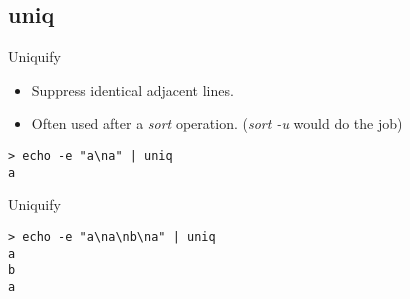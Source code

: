 \subsection{uniq}

\begin{frame}[fragile]{Uniquify}
\begin{itemize}
\item Suppress identical adjacent lines.
  \pause \item Often used after a \emph{sort} operation. (\emph{sort -u} would do the job)
\end{itemize}
  \pause
  \begin{exampleblock}{}
    \begin{lstlisting}[showstringspaces=false]
> echo -e "a\na" | uniq
a
    \end{lstlisting}
  \end{exampleblock}
\end{frame}

\begin{frame}[fragile]{Uniquify}
  \begin{exampleblock}{}
    \begin{lstlisting}[showstringspaces=false]
> echo -e "a\na\nb\na" | uniq
a
b
a
    \end{lstlisting}
  \end{exampleblock}
\end{frame}
